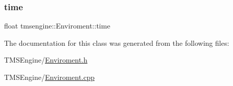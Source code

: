 \mbox{\label{classtmsengine_1_1_enviroment_ae84ce684b9aa9f35f2bfc75bf22ab924}} 
\subsubsection{\texorpdfstring{time}{time}}
{\footnotesize\ttfamily float tmsengine\+::\+Enviroment\+::time\hspace{0.3cm}{\ttfamily [private]}}



The documentation for this class was generated from the following files\+:\begin{DoxyCompactItemize}
\item 
T\+M\+S\+Engine/\hyperlink{_enviroment_8h}{Enviroment.\+h}\item 
T\+M\+S\+Engine/\hyperlink{_enviroment_8cpp}{Enviroment.\+cpp}\end{DoxyCompactItemize}
